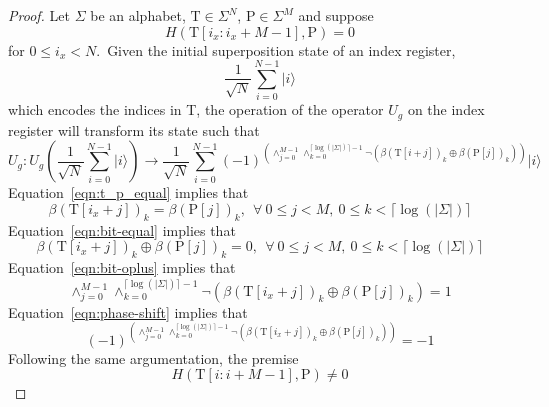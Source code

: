 \begin{proof}
Let $\Sigma$ be an alphabet, $\text{T} \in \Sigma^{N}$, $\text{P} \in \Sigma^{M}$ and suppose 
\begin{equation}\label{eqn:t_p_equal}
H(\text{T}[i_{x}:i_{x} + M-1], \text{P}) = 0
\end{equation}
for $0 \leq i_{x} < N$.\
Given the initial superposition state of an index register,
\begin{equation*}
\frac{1}{\sqrt{N}} \sum_{i=0}^{N-1} \vert i \rangle
\end{equation*}
which encodes the indices in T, the operation of the operator $U_{g}$ on the index register will transform its state such that
\begin{equation*}
U_{g}: U_{g}\left(\frac{1}{\sqrt{N}} \sum_{i=0}^{N-1} \vert i \rangle \right) \rightarrow \frac{1}{\sqrt{N}} \sum_{i=0}^{N-1} (-1)^{\left(\wedge_{j=0}^{M-1} \wedge_{k=0}^{\lceil \log(\vert\Sigma\vert) \rceil-1} \neg\left( \beta(\text{T}[i+j])_k \oplus \beta(\text{P}[j])_{k} \right) \right)} \vert i \rangle
\end{equation*}
Equation~\ref{eqn:t_p_equal} implies that
\begin{equation}\label{eqn:bit-equal}
\beta(\text{T}[i_{x}+j])_k = \beta(\text{P}[j])_{k},\ \ \forall\ 0 \leq j < M,\ 0 \leq k < \lceil \log(\vert\Sigma\vert) \rceil
\end{equation}
Equation~\ref{eqn:bit-equal} implies that
\begin{equation}\label{eqn:bit-oplus}
\beta(\text{T}[i_{x}+j])_k \oplus \beta(\text{P}[j])_{k} = 0,\ \ \forall\ 0 \leq j < M,\ 0 \leq k < \lceil \log(\vert\Sigma\vert) \rceil
\end{equation}
Equation~\ref{eqn:bit-oplus} implies that
\begin{equation}\label{eqn:phase-shift}
\wedge_{j=0}^{M-1} \wedge_{k=0}^{\lceil \log(\vert\Sigma\vert) \rceil-1} \neg\left( \beta(\text{T}[i_{x}+j])_k \oplus \beta(\text{P}[j])_{k} \right) = 1
\end{equation}
Equation~\ref{eqn:phase-shift} implies that
\begin{equation}
(-1)^{\left(\wedge_{j=0}^{M-1} \wedge_{k=0}^{\lceil \log(\vert\Sigma\vert) \rceil-1} \neg\left( \beta(\text{T}[i_{x}+j])_k \oplus \beta(\text{P}[j])_{k} \right) \right)} = -1
\end{equation}
Following the same argumentation, the premise
\begin{equation}
H(\text{T}[i:i + M-1], \text{P}) \neq 0
\end{equation}

\end{proof}
